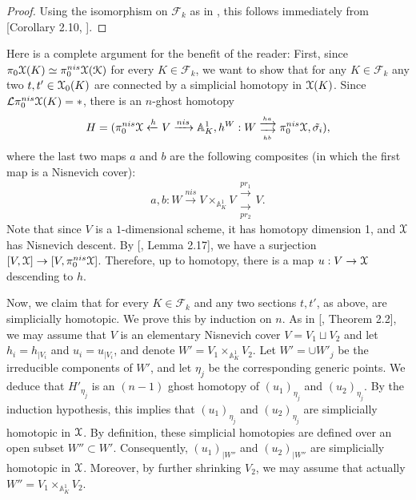 \begin{proof}
    Using the isomorphism on $\mathcal{F}_k$ as in , this follows immediately from [Corollary 2.10, \cite{bachmann2024strongly}].
\end{proof}
\begin{rem}
Here is a complete argument for the benefit of the reader: First, since $\pi_0\EuScript{X}(K)\simeq
    \pi_0^{nis}\EuScript{X(K)}$ for every $K\in \mathcal{F}_k$, we want to show that for any $K\in \mathcal{F}_k$ any two $t,t'\in \EuScript{X}_0(K)$ are connected by a simplicial homotopy in $\EuScript{X}(K)$. Since $\mathcal{L}\pi_0^{nis}\EuScript{X}(K)=*$, there is an $n$-ghost homotopy $$H=(\pi_0^{nis}\EuScript{X}\xleftarrow{h}V\xrightarrow[]{nis} \mathbb{A}^1_K,h^W:W\mathrel{\substack{\xrightarrow{ha} \\ \xrightarrow[hb]{}}} \pi_0^{nis}\EuScript{X}, \tilde{\sigma_i}),$$ where the last two maps $a$ and $b$ are the following composites (in which the first map is a Nisnevich cover): $$a,b: W\xrightarrow{nis}V\times_{\mathbb{A}^1_K}V\mathrel{\substack{\xrightarrow{pr_1} \\ \xrightarrow[pr_2]{}}} V.$$ Note that since $V$ is a $1$-dimensional scheme, it has homotopy dimension 1, and $\EuScript{X}$ has Nisnevich descent. By [\cite{bachmann2024strongly}, Lemma 2.17], we have a surjection $[V,\EuScript{X}]\to [V, \pi_0^{nis}\EuScript{X}]$. Therefore, up to homotopy, there is a map $u: V\to \EuScript{X}$ descending to $h$.
    

Now, we claim that for every $K\in \mathcal{F}_k$ and any two sections $ t,t'$, as above, are simplicially homotopic. We prove this by induction on $n$. As in [\cite{10.2140/akt.2022.7.385}, Theorem 2.2], we may assume that $V$ is an elementary Nisnevich cover $V=V_1\sqcup V_2$ and let $h_i=h_{|V_i}$ and $u_i=u_{|V_i}$, and denote $W'=V_1\times _{\mathbb{A}^1_K}V_2$. Let $W'=\cup W'_j$ be the irreducible components of $W'$, and let $\eta _j$ be the corresponding generic points. We deduce that $H'_{\eta_j}$ is an $(n-1) $ ghost homotopy of ${(u_1)}_{\eta_j}$ and $(u_2)_{\eta_j}$. By the induction hypothesis, this implies that $(u_1)_{\eta_j}$ and $(u_2)_{\eta_j} $ are simplicially homotopic in $\EuScript{X}$. By definition, these simplicial homotopies are defined over an open subset $W ''\subset  W '$. Consequently, $(u_1)_{|W''}$ and $(u_2)_{|W''}$ are simplicially homotopic in $\EuScript{X}$. Moreover, by further shrinking $V_2$, we may assume that actually $ W''= V_1 \times _{\mathbb{A}^1_K}V_2$. 


\end{rem}
